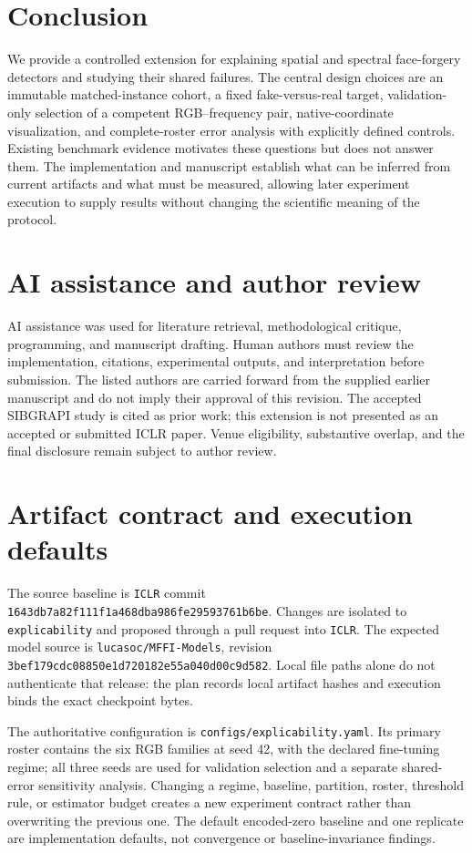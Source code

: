 \documentclass{article}
\begin{document}
\section{Conclusion}
We provide a controlled extension for explaining spatial and spectral face-forgery detectors and studying their shared failures. The central design choices are an immutable matched-instance cohort, a fixed fake-versus-real target, validation-only selection of a competent RGB--frequency pair, native-coordinate visualization, and complete-roster error analysis with explicitly defined controls. Existing benchmark evidence motivates these questions but does not answer them. The implementation and manuscript establish what can be inferred from current artifacts and what must be measured, allowing later experiment execution to supply results without changing the scientific meaning of the protocol.

\section*{AI assistance and author review}
AI assistance was used for literature retrieval, methodological critique, programming, and manuscript drafting. Human authors must review the implementation, citations, experimental outputs, and interpretation before submission. The listed authors are carried forward from the supplied earlier manuscript and do not imply their approval of this revision. The accepted SIBGRAPI study is cited as prior work; this extension is not presented as an accepted or submitted ICLR paper. Venue eligibility, substantive overlap, and the final disclosure remain subject to author review.




\appendix
\section{Artifact contract and execution defaults}
\label{app:reproduce}
The source baseline is \texttt{ICLR} commit \texttt{1643db7a82f111f1a468dba986fe29593761b6be}. Changes are isolated to \texttt{explicability} and proposed through a pull request into \texttt{ICLR}. The expected model source is \texttt{lucasoc/MFFI-Models}, revision \texttt{3bef179cdc08850e1d720182e55a040d00c9d582}. Local file paths alone do not authenticate that release: the plan records local artifact hashes and execution binds the exact checkpoint bytes.

The authoritative configuration is \texttt{configs/explicability.yaml}. Its primary roster contains the six RGB families at seed 42, with the declared fine-tuning regime; all three seeds are used for validation selection and a separate shared-error sensitivity analysis. Changing a regime, baseline, partition, roster, threshold rule, or estimator budget creates a new experiment contract rather than overwriting the previous one. The default encoded-zero baseline and one replicate are implementation defaults, not convergence or baseline-invariance findings.
\end{document}
